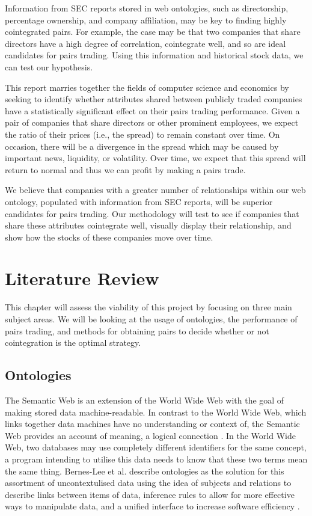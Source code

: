 \documentclass{UoYCSproject}
\begin{document}
Information from SEC reports stored in web ontologies, such as directorship, percentage ownership, and company affiliation, may be key to finding highly cointegrated pairs. For example, the case may be that two companies that share directors have a high degree of correlation, cointegrate well, and so are ideal candidates for pairs trading. Using this information and historical stock data, we can test our hypothesis.

This report marries together the fields of computer science and economics by seeking to identify whether attributes shared between publicly traded companies have a statistically significant effect on their pairs trading performance. Given a pair of companies that share directors or other prominent employees, we expect the ratio of their prices (i.e., the spread) to remain constant over time. On occasion, there will be a divergence in the spread which may be caused by important news, liquidity, or volatility. Over time, we expect that this spread will return to normal and thus we can profit by making a pairs trade.

We believe that companies with a greater number of relationships within our web ontology, populated with information from SEC reports, will be superior candidates for pairs trading. Our methodology will test to see if companies that share these attributes cointegrate well, visually display their relationship, and show how the stocks of these companies move over time.

\chapter{Literature Review}
\label{cha:Literature Review}

This chapter will assess the viability of this project by focusing on three main subject areas. We will be looking at the usage of ontologies, the performance of pairs trading, and methods for obtaining pairs to decide whether or not cointegration is the optimal strategy.

\section{Ontologies}

The Semantic Web is an extension of the World Wide Web with the goal of making stored data machine-readable. In contrast to the World Wide Web, which links together data machines have no understanding or context of, the Semantic Web provides an account of meaning, a logical connection \parencite{semanticrevisited}. In the World Wide Web, two databases may use completely different identifiers for the same concept, a program intending to utilise this data needs to know that these two terms mean the same thing. Bernes-Lee et al. describe ontologies as the solution for this assortment of uncontextulised data using the idea of subjects and relations to describe links between items of data, inference rules to allow for more effective ways to manipulate data, and a unified interface to increase software efficiency \parencite{semanticontologies}.
\end{document}
